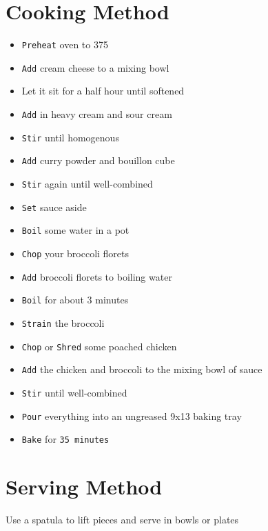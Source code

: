 \documentclass{article}
\let\US\SI
\begin{document}
\begin{multicols}{2}
\section{Cooking Method}
\begin{itemize}
	\item \verb|Preheat| oven to \US{375}{\fahrenheit}	
	\item \verb|Add| cream cheese to a mixing bowl
	\item Let it sit for a half hour until softened
	\item \verb|Add| in heavy cream and sour cream
	\item \verb|Stir| until homogenous
	\item \verb|Add| curry powder\cite{CURRYPOWDER} and bouillon cube
	\item \verb|Stir| again until well-combined
	\item \verb|Set| sauce aside
	\item \verb|Boil| some water in a pot
	\item \verb|Chop| your broccoli florets
	\item \verb|Add| broccoli florets to boiling water
	\item \verb|Boil| for about 3 minutes
	\item \verb|Strain| the broccoli
	\item \verb|Chop| or \verb|Shred| some poached chicken\cite{CHICKEN}
	\item \verb|Add| the chicken and broccoli to the mixing bowl of sauce
	\item \verb|Stir| until well-combined
	\item \verb|Pour| everything into an ungreased 9x13 baking tray
	\item \verb|Bake| for \verb|35 minutes|
\end{itemize}

\section{Serving Method}
Use a spatula to lift pieces and serve in bowls or plates



\end{multicols}
\end{document}

